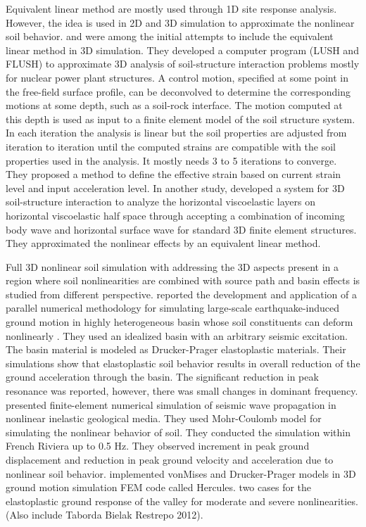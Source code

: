 Equivalent linear method are mostly used through 1D site response analysis. However, the idea is used in 2D and 3D simulation to approximate the nonlinear soil behavior. \citet{Lysmer1974} and \citet{Lysmer1975} were among the initial attempts to include the equivalent linear method in 3D simulation. They developed a computer program (LUSH and FLUSH) to approximate 3D analysis of soil-structure interaction problems mostly for nuclear power plant structures. A control motion,  specified at some point in the free-field surface profile, can be deconvolved to determine the corresponding motions at some depth, such as a soil-rock interface. The motion computed at this depth is used as input to a finite element model of the soil structure system. In each iteration the analysis is linear but the soil properties are adjusted from iteration to iteration until the computed strains are compatible with the soil properties used in the analysis. It mostly needs 3 to 5 iterations to converge. They proposed a method to define the effective strain based on current strain level and input acceleration level. In another study, \citet{Lysmer1981} developed a system for 3D soil-structure interaction to analyze the horizontal viscoelastic layers on horizontal viscoelastic half space through accepting a combination of incoming body wave and horizontal surface wave for standard 3D finite element structures. They approximated the nonlinear effects by an equivalent linear method.  

Full 3D nonlinear soil simulation with addressing the 3D aspects present in a region where soil nonlinearities are combined with source path and basin effects is studied from different perspective. \citet{Xu2003} reported the development and application of a parallel numerical methodology for simulating large-scale earthquake-induced ground motion in highly heterogeneous basin whose soil constituents can deform nonlinearly . They used an idealized basin with an arbitrary seismic excitation. The basin material is modeled as Drucker-Prager elastoplastic materials. Their simulations show that elastoplastic soil behavior results in overall reduction of the ground acceleration through the basin. The significant reduction in peak resonance was reported, however, there was small changes in dominant frequency. \cite{Dupros2010} presented finite-element numerical simulation of seismic wave propagation in nonlinear inelastic geological media. They used Mohr-Coulomb model for simulating the nonlinear behavior of soil. They conducted the simulation within French Riviera up to 0.5 Hz. They observed increment in peak ground displacement and reduction in peak ground velocity and acceleration due to nonlinear soil behavior. \citet{Taborda2010} implemented vonMises and Drucker-Prager models in 3D ground motion simulation FEM code called Hercules.  two cases for the elastoplastic ground response of the valley for moderate and severe nonlinearities.  (Also include Taborda Bielak Restrepo 2012).

